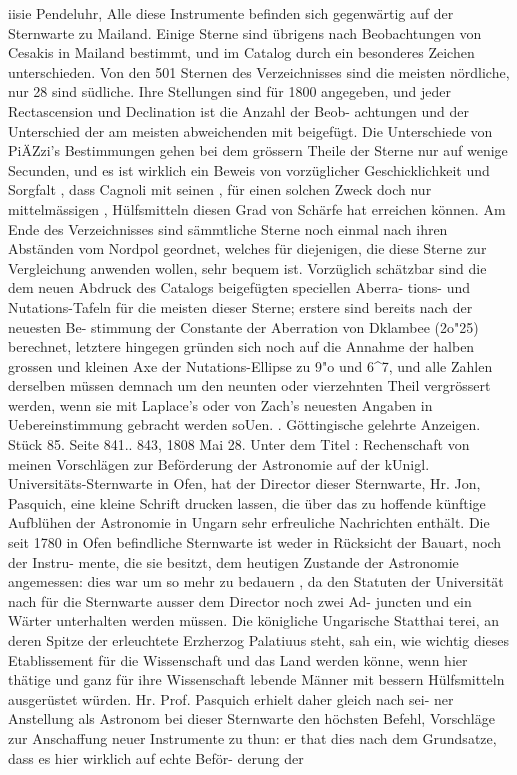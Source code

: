 \documentclass[12pt,a4paper]{article}
\begin{document}
iisie  Pendeluhr,  Alle  diese  Instrumente  befinden  sich  gegenwärtig  auf  der  Sternwarte  zu  Mailand. Einige  Sterne  sind  übrigens  nach  Beobachtungen  von  Cesakis  in  Mailand  bestimmt,  und  im  Catalog durch  ein  besonderes  Zeichen  unterschieden. Von  den  501  Sternen  des  Verzeichnisses  sind  die  meisten  nördliche,  nur  28  sind  südliche.  Ihre Stellungen  sind  für  1800  angegeben,  und  jeder  Rectascension  und  Declination  ist  die  Anzahl  der  Beob- achtungen und  der  Unterschied  der  am  meisten  abweichenden  mit  beigefügt.  Die  Unterschiede  von PiÄZzi's  Bestimmungen  gehen  bei  dem  grössern  Theile  der  Sterne  nur  auf  wenige  Secunden,  und  es  ist wirklich  ein  Beweis  von  vorzüglicher  Geschicklichkeit  und  Sorgfalt ,  dass  Cagnoli  mit  seinen ,  für  einen solchen  Zweck  doch  nur  mittelmässigen ,  Hülfsmitteln  diesen  Grad  von  Schärfe  hat  erreichen  können. Am  Ende  des  Verzeichnisses  sind  sämmtliche  Sterne  noch  einmal  nach  ihren  Abständen  vom  Nordpol geordnet,  welches  für  diejenigen,  die  diese  Sterne  zur  Vergleichung  anwenden  wollen,  sehr  bequem  ist. Vorzüglich  schätzbar  sind  die  dem  neuen  Abdruck  des  Catalogs  beigefügten  speciellen  Aberra- tions-  und  Nutations-Tafeln  für  die  meisten  dieser  Sterne;  erstere  sind  bereits  nach  der  neuesten  Be- stimmung der  Constante  der  Aberration  von  Dklambee  (2o"25)  berechnet,  letztere  hingegen  gründen  sich noch  auf  die  Annahme  der  halben  grossen  und  kleinen  Axe  der  Nutations-Ellipse  zu  9"o  und  6\textasciicircum{}7,  und alle  Zahlen  derselben  müssen  demnach  um  den  neunten  oder  vierzehnten  Theil  vergrössert  werden,  wenn sie  mit  Laplace's  oder  von  Zach's  neuesten  Angaben  in  Uebereinstimmung  gebracht  werden  soUen.    . Göttingische  gelehrte  Anzeigen.     Stück  85.  Seite  841.. 843,     1808  Mai  28. Unter  dem  Titel :  Rechenschaft  von  meinen  Vorschlägen  zur  Beförderung  der  Astronomie  auf  der kUnigl.  Universitäts-Sternwarte  in  Ofen,  hat  der  Director  dieser  Sternwarte,  Hr.  Jon,  Pasquich,  eine kleine  Schrift  drucken  lassen,  die  über  das  zu  hoffende  künftige  Aufblühen  der  Astronomie  in  Ungarn sehr  erfreuliche  Nachrichten  enthält. Die  seit  1780  in  Ofen  befindliche  Sternwarte  ist  weder  in  Rücksicht  der  Bauart,  noch  der  Instru- mente, die  sie  besitzt,  dem  heutigen  Zustande  der  Astronomie  angemessen:  dies  war  um  so  mehr  zu bedauern ,  da  den  Statuten  der  Universität  nach  für  die  Sternwarte  ausser  dem  Director  noch  zwei  Ad- juncten  und  ein  Wärter  unterhalten  werden  müssen.  Die  königliche  Ungarische  Statthai terei,  an  deren Spitze  der  erleuchtete  Erzherzog  Palatiuus  steht,  sah  ein,  wie  wichtig  dieses  Etablissement  für  die Wissenschaft  und  das  Land  werden  könne,  wenn  hier  thätige  und  ganz  für  ihre  Wissenschaft  lebende Männer  mit  bessern  Hülfsmitteln  ausgerüstet  würden.  Hr.  Prof.  Pasquich  erhielt  daher  gleich  nach  sei- ner Anstellung  als  Astronom  bei  dieser  Sternwarte  den  höchsten  Befehl,  Vorschläge  zur  Anschaffung neuer  Instrumente  zu  thun:  er  that  dies  nach  dem  Grundsatze,  dass  es  hier  wirklich  auf  echte  Beför- derung der  
\end{document}
